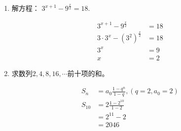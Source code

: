 \documentclass[answers]{exam}
\begin{document}
\begin{questions}
	\begin{enumerate}[label=(\arabic*)]
		\item 解方程： $3^{x+1} - 9^{\frac{x}{2}} = 18$.
		      \begin{solution}
			      \begin{align*}
				      3^{x+1} - 9^{\frac{x}{2}}        & = 18 \\
				      3\cdot 3^x - (3^2)^{\frac{x}{2}} & = 18 \\
				      3^x                              & = 9  \\
				      x                                & = 2
			      \end{align*}
		      \end{solution}
		\item 求数列$2,4,8,16,\cdots $前十项的和。
		      \begin{solution}
			      \begin{align*}
				      S_n    & = a_0\frac{1-q^n}{1-q}, (q=2, a_0=2) \\
				      S_{10} & = 2\frac{1-2^{10}}{1-2}              \\
				             & = 2^{11} - 2                         \\
				             & = 2046
			      \end{align*}
		      \end{solution}
	\end{enumerate}

\end{questions}
\end{document}
